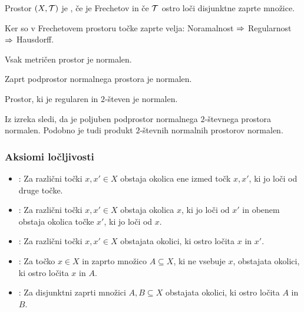 \begin{definicija}
    Prostor $(X, \mathcal{T})$ je , če je Frechetov in če $\mathcal{T}$ ostro loči disjunktne zaprte množice.
\end{definicija}

\begin{opomba}
    Ker so v Frechetovem prostoru točke zaprte velja: Noramalnost $\Rightarrow$ Regularnost $\Rightarrow$ Hausdorff.
\end{opomba}

\begin{trditev}
    Vsak metričen prostor je normalen.
\end{trditev}

\begin{trditev}
    Zaprt podprostor normalnega prostora je normalen. 
\end{trditev}

\begin{izrek}
    Prostor, ki je regularen in $2$-števen je normalen.
\end{izrek}

\begin{opomba}
    Iz izreka sledi, da je poljuben podprostor normalnega $2$-števnega prostora normalen. Podobno je tudi produkt $2$-števnih normalnih prostorov normalen.
\end{opomba}

\subsubsection{Aksiomi ločljivosti}
\begin{itemize}
    \item [] : Za različni točki $x, x' \in X$ obstaja okolica ene izmed točk $x, x'$, ki jo loči od druge točke.
    \item [] : Za različni točki $x, x' \in X$ obstaja okolica $x$, ki jo loči od $x'$ in obenem obstaja okolica točke $x'$, ki jo loči od $x$.
    \item [] : Za različni točki $x, x' \in X$ obstajata okolici, ki ostro ločita $x$ in $x'$.
    \item [] : Za točko $x \in X$ in zaprto množico $A \subseteq X$, ki ne vsebuje $x$, obstajata okolici, ki ostro ločita $x$ in $A$.
    \item [] : Za disjunktni zaprti množici $A, B \subseteq X$ obstajata okolici, ki ostro ločita $A$ in $B$.
\end{itemize}

